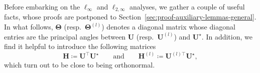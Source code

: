 %
%
%
%
%
%
%
%
Before embarking on the $\ell_{\infty}$ and $\ell_{2,\infty}$ analyses,
we gather a couple of useful facts, whose proofs are postponed to
Section~\ref{sec:proof-auxiliary-lemmas-general}. In what follows,
$\bm{\Theta}$ (resp.~$\bm{\Theta}^{(l)}$) denotes a diagonal matrix
whose diagonal entries are the principal angles between $\bm{U}$
(resp.~$\bm{U}^{(l)}$) and $\bm{U}^{\star}$. In addition, we find
it helpful to introduce the following matrices
\begin{equation}
\bm{H}\coloneqq\bm{U}^{\top}\bm{U}^{\star}\qquad\text{and}\qquad\bm{H}^{(l)}\coloneqq\bm{U}^{(l)\top}\bm{U}^{\star},\label{eq:defn-H-Hl-general}
\end{equation}
which turn out to be close to being orthonormal.

